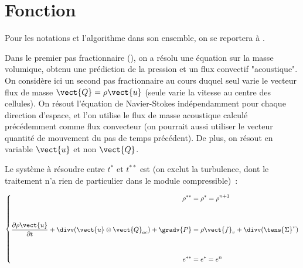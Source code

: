 
%
%
%
%


%
\vspace{1cm}
\section*{Fonction}

Pour les notations et l'algorithme dans son ensemble,
on se reportera à .

Dans le premier pas fractionnaire (), on a résolu une
équation sur la masse volumique, obtenu une prédiction de la pression
et un flux convectif "acoustique".
On considère ici un second pas fractionnaire au cours duquel seul varie
le vecteur flux de masse $\vect{Q}=\rho\vect{u}$
(seule varie la vitesse au centre des cellules).
On résout l'équation de Navier-Stokes indépendamment
pour chaque direction d'espace, et l'on utilise le flux de masse acoustique
calculé précédemment comme flux convecteur (on pourrait aussi utiliser
le vecteur quantité de mouvement du pas de temps précédent).
De plus, on résout en variable $\vect{u}$ et non $\vect{Q}$.

Le système à résoudre entre $t^*$ et $t^{**}$ est (on exclut
la turbulence, dont le traitement n'a rien de particulier dans le
module compressible)~:

\begin{equation}\label{Cfbl_Cfqdmv_eq_qdm_cfqdmv}
\left\{
\begin{aligned}
\rho^{**} &= \rho^{*}=\rho^{n+1} \\[1em]
&\\
\displaystyle\frac{\partial \rho\vect{u}}{\partial t}
+ \divv(\vect{u} \otimes \vect{Q}_{ac}) + \gradv{P}
&= \rho \vect{f}_v + \divv(\tens{\Sigma}^v) \\[1em]
&\\
e^{**} &= e^{*}=e^n
\end{aligned}
\right.
\end{equation}

